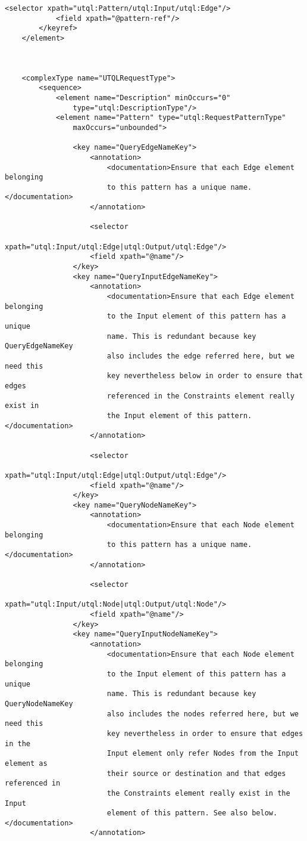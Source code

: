 \documentclass[11pt]{article}
\begin{document}
\begin{Verbatim}[fontsize=\footnotesize,tabsize=2]
            <selector xpath="utql:Pattern/utql:Input/utql:Edge"/>
            <field xpath="@pattern-ref"/>
        </keyref>
    </element>
    
    
    
    <complexType name="UTQLRequestType">
        <sequence>
            <element name="Description" minOccurs="0"
				type="utql:DescriptionType"/>
            <element name="Pattern" type="utql:RequestPatternType"
				maxOccurs="unbounded">

                <key name="QueryEdgeNameKey">
                    <annotation>
                        <documentation>Ensure that each Edge element belonging
                        to this pattern has a unique name.</documentation>
                    </annotation>
                    
                    <selector
						xpath="utql:Input/utql:Edge|utql:Output/utql:Edge"/>
                    <field xpath="@name"/>
                </key>
                <key name="QueryInputEdgeNameKey">
                    <annotation>
                        <documentation>Ensure that each Edge element belonging
                        to the Input element of this pattern has a unique
                        name. This is redundant because key QueryEdgeNameKey
                        also includes the edge referred here, but we need this
                        key nevertheless below in order to ensure that edges
                        referenced in the Constraints element really exist in
                        the Input element of this pattern.</documentation>
                    </annotation>
                    
                    <selector
						xpath="utql:Input/utql:Edge|utql:Output/utql:Edge"/>
                    <field xpath="@name"/>
                </key>
                <key name="QueryNodeNameKey">
                    <annotation>
                        <documentation>Ensure that each Node element belonging
                        to this pattern has a unique name.</documentation>
                    </annotation>
                    
                    <selector
						xpath="utql:Input/utql:Node|utql:Output/utql:Node"/>
                    <field xpath="@name"/>
                </key>
                <key name="QueryInputNodeNameKey">
                    <annotation>
                        <documentation>Ensure that each Node element belonging
                        to the Input element of this pattern has a unique
                        name. This is redundant because key QueryNodeNameKey
                        also includes the nodes referred here, but we need this
                        key nevertheless in order to ensure that edges in the
                        Input element only refer Nodes from the Input element as
                        their source or destination and that edges referenced in
                        the Constraints element really exist in the Input
                        element of this pattern. See also below.</documentation>
                    </annotation>
                    

\end{Verbatim}
\end{document}
